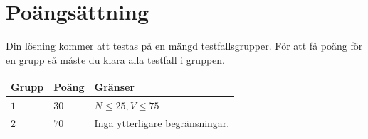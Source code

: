 \section*{Poängsättning}
Din lösning kommer att testas på en mängd testfallsgrupper.
För att få poäng för en grupp så måste du klara alla testfall i gruppen.

\noindent
\begin{tabular}{| l | l | p{12cm} |}
  \hline
  \textbf{Grupp} & \textbf{Poäng} & \textbf{Gränser} \\ \hline
  $1$    & $30$       & $N \leq 25, V \leq 75$ \\ \hline
  $2$    & $70$       & Inga ytterligare begränsningar. \\ \hline
\end{tabular}
